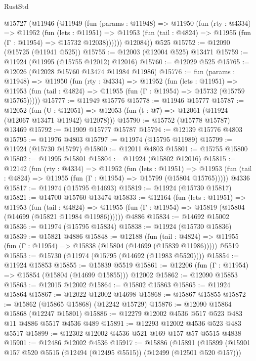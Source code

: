 \begin{lexlean}{RustStd}
\begin{coremodule}
{\begin{coremodule}
{{{{{{{{{{{{{{{{{{{{{{{{{{{{{{{{{{{{{{{{{{{{{{{{{{{{{{{{{{{{{{{{{{{{{{{{{{{{{{{{    @15727
      (@11946
        (@11949
          (fun (params : @11948) =>
          @11950
            (fun (rty : @4334) =>
            @11952
              (fun (lets : @11951) =>
              @11953 (fun (tail : @4824) => @11955 (fun (Γ : @11954) => @15732 @12038))))))
        @12084))
    @525
@15752 := @12090 (@15725 (@11941 @525))
@15755 := @12003 (@12004 @525) @13471
@15759 := @11924 (@11995 (@15755 @12012) @12016)
@15760 := @12029 @525
@15765 := @12026 (@12028 @15760 @13474 @11984 @11986)
@15776 := fun (params : @11948) =>
  @11950
    (fun (rty : @4334) =>
    @11952
      (fun (lets : @11951) =>
      @11953 (fun (tail : @4824) => @11955 (fun (Γ : @11954) => @15732 (@15759 @15765)))))
@15777 := @11949 @15776
@15778 := @11946 @15777
@15787 := @12052
    (fun (U : @12051) => @12053 (fun (t : @7) => @12061 (@11924 (@12067 @13471 @11942) @12078)))
@15790 := @15752 (@15778 @15787) @13469
@15792 := @11909 @15777 @15787
@15794 := @12139 @15776 @4803
@15795 := @11976 @4803
@15797 := @11974 (@15795 @11989)
@15799 := @11924 (@15730 @15797)
@15800 := @12011 @4803
@15801 := @15755 @15800
@15802 := @11995 @15801
@15804 := @11924 (@15802 @12016)
@15815 := @12142
    (fun (rty : @4334) =>
    @11952
      (fun (lets : @11951) =>
      @11953 (fun (tail : @4824) => @11955 (fun (Γ : @11954) => @15799 (@15804 @15765)))))
    @4336
@15817 := @11974 (@15795 @14693)
@15819 := @11924 (@15730 @15817)
@15821 := @14700 @15760 @13474
@15833 := @12164
    (fun (lets : @11951) =>
    @11953
      (fun (tail : @4824) =>
      @11955 (fun (Γ : @11954) => @15819 (@15804 (@14699 (@15821 @11984 @11986))))))
    @4886
@15834 := @14692 @15002
@15836 := @11974 (@15795 @15834)
@15838 := @11924 (@15730 @15836)
@15839 := @15821 @4886
@15848 := @12188
    (fun (tail : @4824) => @11955 (fun (Γ : @11954) => @15838 (@15804 (@14699 (@15839 @11986)))))
    @5519
@15853 := @15730 (@11974 (@15795 (@14692 (@11983 @5520))))
@15854 := @11924 @15853
@15855 := @15839 @5519
@15861 := @12206 (fun (Γ : @11954) => @15854 (@15804 (@14699 @15855))) @12002
@15862 := @12090 @15853
@15863 := @12015 @12002
@15864 := @15802 @15863
@15865 := @11924 @15864
@15867 := @12022 @12002 @14698
@15868 := @15867 @15855
@15872 := @15862 (@15865 @15868) (@12242 @15729)
@15876 := @12090 @15864 @15868 (@12247 @15801)
@15886 := @12279 @12002 @4536 @517 @523 @483 @11 @4886 @5517 @4536 @489
@15891 := @12293 @12002 @4536 @523 @483 @5517
@15899 := @12302 @12002 @4536 @521 @169 @157 @57 @5515 @4838
@15901 := @12486 @12002 @4536
@15917 := @15886
    (@15891
      (@15899
        (@15901 @157 @520 @5515 (@12494 (@12495 @5515)) (@12499 (@12501 @520 @157)))
}}}}}}}}}}}}}}}}}}}}}}}}}}}}}}}}}}}}}}}}}}}}}}}}}}}}}}}}}}}}}}}}}}}}}}}}}}}}}}}}
\end{coremodule}}
\end{coremodule}
\end{lexlean}
